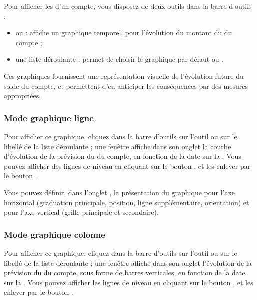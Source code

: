 Pour afficher les  d'un compte, vous disposez de deux outils dans la barre d'outils :

\begin{itemize}
	\item {} ou  : affiche un graphique temporel, pour l'évolution du montant du  du compte ; 
	\item une liste déroulante : permet de choisir le graphique par défaut  ou .
\end{itemize}

Ces graphiques fournissent une représentation visuelle de l'évolution future du solde du compte, et permettent d'en anticiper les conséquences par des mesures appropriées.


\subsubsection{Mode graphique ligne}

Pour afficher ce graphique, cliquez dans la barre d'outils sur l'outil  ou sur le libellé  de la liste déroulante ; une fenêtre affiche dans son onglet  la courbe d'évolution de la prévision du  du compte, en fonction de la date sur la . Vous pouvez afficher des lignes de niveau en cliquant sur le bouton , et les enlever par le bouton . 

Vous pouvez définir, dans l'onglet , la présentation du graphique pour l'axe horizontal (graduation principale, position, ligne supplémentaire, orientation) et pour l'axe vertical (grille principale et secondaire). 


\subsubsection{Mode graphique colonne}

Pour afficher ce graphique, cliquez dans la barre d'outils sur l'outil  ou sur le libellé  de la liste déroulante ; une fenêtre affiche dans son onglet  l'évolution de la prévision du  du compte, sous forme de barres verticales, en fonction de la date sur la . Vous pouvez afficher les lignes de niveau en cliquant sur le bouton , et les enlever par le bouton .

